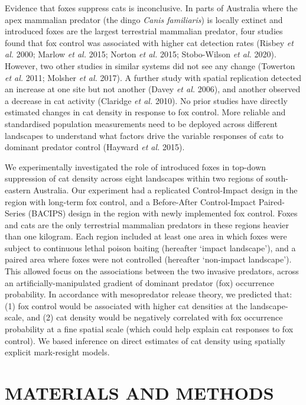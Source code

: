 \documentclass[preprint, 3p, authoryear]{elsarticle} %
\begin{document}
Evidence that foxes suppress cats is inconclusive. In parts of Australia where the apex mammalian predator (the dingo \emph{Canis familiaris}) is locally extinct and introduced foxes are the largest terrestrial mammalian predator, four studies found that fox control was associated with higher cat detection rates (Risbey \emph{et al.} 2000; Marlow \emph{et al.} 2015; Norton \emph{et al.} 2015; Stobo-Wilson \emph{et al.} 2020). However, two other studies in similar systems did not see any change (Towerton \emph{et al.} 2011; Molsher \emph{et al.} 2017). A further study with spatial replication detected an increase at one site but not another (Davey \emph{et al.} 2006), and another observed a decrease in cat activity (Claridge \emph{et al.} 2010). No prior studies have directly estimated changes in cat density in response to fox control. More reliable and standardised population measurements need to be deployed across different landscapes to understand what factors drive the variable responses of cats to dominant predator control (Hayward \emph{et al.} 2015).

We experimentally investigated the role of introduced foxes in top-down suppression of cat density across eight landscapes within two regions of south-eastern Australia. Our experiment had a replicated Control-Impact design in the region with long-term fox control, and a Before-After Control-Impact Paired-Series (BACIPS) design in the region with newly implemented fox control. Foxes and cats are the only terrestrial mammalian predators in these regions heavier than one kilogram. Each region included at least one area in which foxes were subject to continuous lethal poison baiting (hereafter `impact landscape'), and a paired area where foxes were not controlled (hereafter `non-impact landscape'). This allowed focus on the associations between the two invasive predators, across an artificially-manipulated gradient of dominant predator (fox) occurrence probability. In accordance with mesopredator release theory, we predicted that: (1) fox control would be associated with higher cat densities at the landscape-scale, and (2) cat density would be negatively correlated with fox occurrence probability at a fine spatial scale (which could help explain cat responses to fox control). We based inference on direct estimates of cat density using spatially explicit mark-resight models.

\newpage

\hypertarget{materials-and-methods}{%
\section{MATERIALS AND METHODS}\label{materials-and-methods}}
\end{document}
